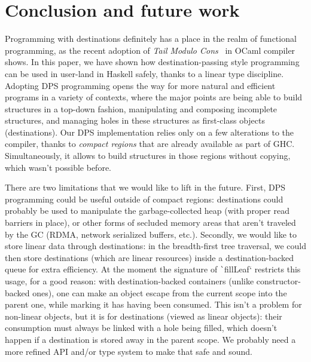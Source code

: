\documentclass[english]{jflart}
\begin{document}
\section{Conclusion and future work}

Programming with destinations definitely has a place in the realm of functional programming, as the recent adoption of \emph{Tail Modulo Cons}~\cite{bour_tmc_2021} in OCaml compiler shows. In this paper, we have shown how destination-passing style programming can be used in user-land in Haskell safely, thanks to a linear type discipline. Adopting DPS programming opens the way for more natural and efficient programs in a variety of contexts, where the major points are being able to build structures in a top-down fashion, manipulating and composing incomplete structures, and managing holes in these structures as first-class objects (destinations). Our DPS implementation relies only on a few alterations to the compiler, thanks to \emph{compact regions} that are already available as part of GHC. Simultaneously, it allows to build structures in those regions without copying, which wasn't possible before.

There are two limitations that we would like to lift in the future. First, DPS programming could be useful outside of compact regions: destinations could probably be used to manipulate the garbage-collected heap (with proper read barriers in place), or other forms of secluded memory areas that aren't traveled by the GC (RDMA, network serialized buffers, etc.). Secondly, we would like to store linear data through destinations: in the breadth-first tree traversal, we could then store destinations (which are linear resources) inside a destination-backed queue for extra efficiency. At the moment the signature of \texttt`fillLeaf` restricts this usage, for a good reason: with destination-backed containers (unlike constructor-backed ones), one can make an object escape from the current scope into the parent one, while marking it has having been consumed. This isn't a problem for non-linear objects, but it is for destinations (viewed as linear objects): their consumption must always be linked with a hole being filled, which doesn't happen if a destination is stored away in the parent scope. We probably need a more refined API and/or type system to make that safe and sound.

\clearpage{}
{}

\end{document}
